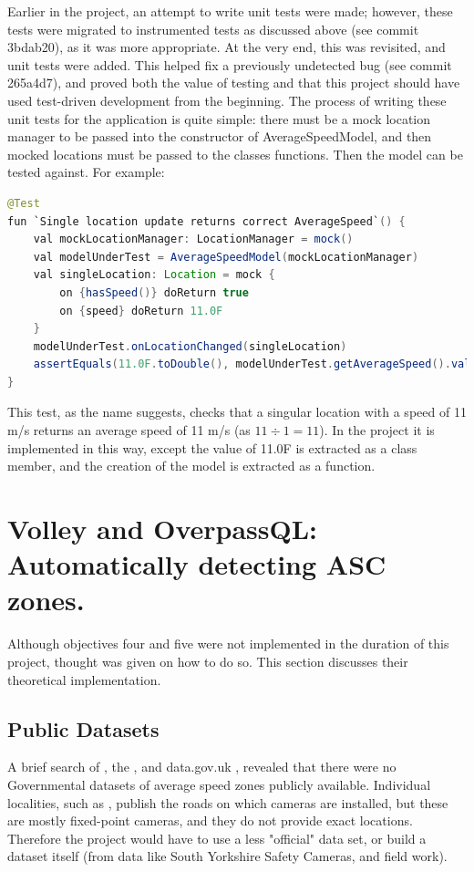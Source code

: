 \documentclass[11pt, a4paper, notitlepage]{report}
\begin{document}
Earlier in the project, an attempt to write unit tests were made; however, these tests were migrated to instrumented tests as discussed above (see commit 3bdab20), as it was more appropriate. At the very end, this was revisited, and unit tests were added. This helped fix a previously undetected bug (see commit 265a4d7), and proved both the value of testing and that this project should have used test-driven development from the beginning. The process of writing these unit tests for the application is quite simple: there must be a mock location manager to be passed into the constructor of AverageSpeedModel, and then mocked locations must be passed to the classes functions. Then the model can be tested against. For example:
\begin{lstlisting}[language=java,breaklines=true]
@Test
fun `Single location update returns correct AverageSpeed`() {
	val mockLocationManager: LocationManager = mock()
	val modelUnderTest = AverageSpeedModel(mockLocationManager)
	val singleLocation: Location = mock {
		on {hasSpeed()} doReturn true
		on {speed} doReturn 11.0F
	}
	modelUnderTest.onLocationChanged(singleLocation)
	assertEquals(11.0F.toDouble(), modelUnderTest.getAverageSpeed().value)
}
\end{lstlisting}

This test, as the name suggests, checks that a singular location with a speed of 11 m/s returns an average speed of 11 m/s (as $ 11\div1 = 11 $). In the project it is implemented in this way, except the value of 11.0F is extracted as a class member, and the creation of the model is extracted as a function.

\section{Volley and OverpassQL: Automatically detecting ASC zones.}\label{sec:Vol&OQL}
Although objectives four and five were not implemented in the duration of this project, thought was given on how to do so. This section discusses their theoretical implementation.

\subsection{Public Datasets}
A brief search of \citet{OrdananceSurvey}, the \citet{ONSHome}, and data.gov.uk \citep{dataGovUK}, revealed that there were no Governmental datasets of average speed zones publicly available. Individual localities, such as \citet{sySpeedCamera}, publish the roads on which cameras are installed, but these are mostly fixed-point cameras, and they do not provide exact locations. Therefore the project would have to use a less "official" data set, or build a dataset itself (from data like South Yorkshire Safety Cameras, and field work).
\end{document}
